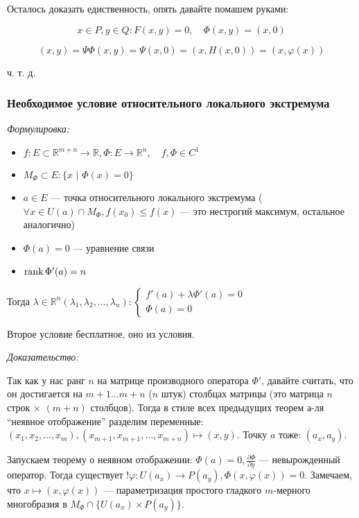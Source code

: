 \documentclass{article}
\def\dbl{\,\,}
\begin{document}
Осталось доказать едиственность, опять давайте помашем руками:

\[x \in P, y \in Q: F(x, y) = 0, \quad \Phi(x, y) = (x, 0)\]

\[(x, y) = \Psi\Phi(x, y) = \Psi(x, 0) = (x, H(x, 0)) = (x, \varphi(x))\]

ч. т. д.

\subsubsection{Необходимое условие относительного локального экстремума}
\textit{Формулировка:}

\begin{itemize}
    \item $f: E \subset \mathbb{R}^{m + n} \rightarrow \mathbb{R}, \Phi: E \rightarrow \mathbb{R}^n, \quad f, \Phi \in C^1$
    \item $M_\Phi \subset E: \{x \dbl | \dbl \Phi(x) = 0\}$
    \item $a \in E$ --- точка относительного локального экстремума ($\forall x \in U(a) \cap M_\Phi, f(x_0) \le f(x)$ --- это нестрогий максимум, остальное аналогично)
    \item $\Phi(a) = 0$ --- уравнение связи
    \item $\rank \Phi'(a) = n$
\end{itemize}

Тогда $\lambda \in \mathbb{R}^n (\lambda_1, \lambda_2, \ldots, \lambda_n): \begin{cases}
    f'(a) + \lambda\Phi'(a) = 0 \\
    \Phi(a) = 0
\end{cases}$

Второе условие бесплатное, оно из условия.

\textit{Доказательство:}

Так как у нас ранг $n$ на матрице производного оператора $\Phi'$, давайте считать, что он достигается на $m + 1 \ldots m + n$ ($n$ штук) столбцах матрицы (это матрица $n$ строк $\times \dbl (m + n)$ столбцов). Тогда в стиле всех предыдущих теорем а-ля ``неявное отображение'' разделим переменные: $(x_1, x_2, \ldots, x_m), (x_{m + 1}, x_{m + 1}, \ldots, x_{m + n}) \mapsto (x, y)$. Точку $a$ тоже: $(a_x, a_y)$. 

Запускаем теорему о неявном отображении: $\Phi(a) = 0, \frac{\partial \Phi}{\partial y}$ --- невырожденный оператор. Тогда существует $! \varphi: U(a_x) \rightarrow P(a_y), \Phi(x, \varphi(x)) = 0$. Замечаем, что $x \mapsto (x, \varphi(x))$ --- параметризация простого гладкого $m$-мерного многобразия в $M_\Phi \cap \{U(a_x) \times P(a_y)\}$.
\end{document}
